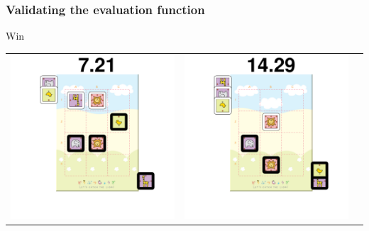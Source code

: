 \documentclass{beamer}
\begin{document}
\begin{frame}
\frametitle{Validating the evaluation function}
Win

\begin{tabular}{ccc}
\includegraphics[scale = 0.15]{val1.pdf} & 
\includegraphics[scale = 0.15]{val2.pdf} & 

\end{tabular}
\end{frame}
\end{document}
